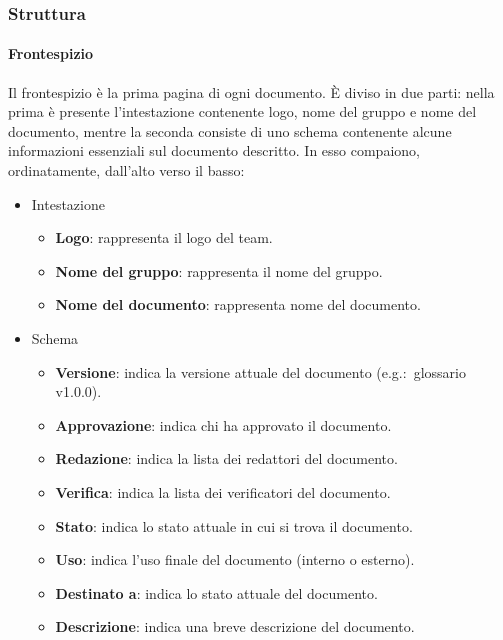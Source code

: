 \documentclass[../norme-di-progetto.tex]{subfiles}
\begin{document}
\subsubsection{Struttura}%
\label{subs:struttura}

\paragraph{Frontespizio}%
\label{par:frontespizio}
Il frontespizio è la prima pagina di ogni documento. È diviso in due parti: nella prima è presente l'intestazione contenente logo, nome del gruppo e nome del documento, mentre la seconda consiste di uno schema contenente alcune informazioni essenziali sul documento descritto. In esso compaiono, ordinatamente, dall'alto verso il basso:

\begin{itemize}
  \item Intestazione
  \begin{itemize}
    \item \textbf{Logo}: rappresenta il logo del team.
    \item \textbf{Nome del gruppo}: rappresenta il nome del gruppo.
    \item \textbf{Nome del documento}: rappresenta nome del documento.
  \end{itemize}
  \item Schema
  \begin{itemize}
    \item \textbf{Versione}: indica la versione attuale del documento (e.g.:\ glossario v1.0.0).
    \item \textbf{Approvazione}: indica chi ha approvato il documento.
    \item \textbf{Redazione}: indica la lista dei redattori del documento.
    \item \textbf{Verifica}: indica la lista dei verificatori del documento.
    \item \textbf{Stato}: indica lo stato attuale in cui si trova il documento.
    \item \textbf{Uso}: indica l'uso finale del documento (interno o esterno).
    \item \textbf{Destinato a}: indica lo stato attuale del documento.
    \item \textbf{Descrizione}: indica una breve descrizione del documento.
  \end{itemize}
\end{itemize}
\end{document}
